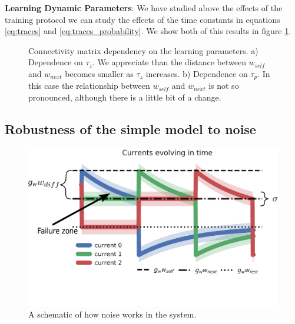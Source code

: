 \documentclass[10pt,a4paper]{article}
\begin{document}
\textbf{Learning Dynamic Parameters}:
We have studied above the effects of the training protocol we can study the effects of the time constants in equations \ref{eq:traces} and \ref{eq:traces_probability}. We show both of this results in figure \ref{fig:simple_bcpnn_learning_tau}. 

\begin{figure}[H]%
    \centering
    \qquad
    \caption{Connectivity matrix dependency on the learning parameters. a) Dependence on $\tau_z$. We appreciate than the distance between $w_{self}$ and $w_{next}$ becomes smaller as $\tau_z$ increases. b) Dependence on $\tau_p$. In this case the relationship between $w_{self}$ and $w_{next}$ is not so pronounced, although there is a little bit of a change. }
    \label{fig:simple_bcpnn_learning_tau}%
\end{figure}

\subsection{Robustness of the simple model to noise}

\begin{figure}[H]
\centering
\includegraphics[scale=0.55]{noise_diagram.pdf}
\caption{A schematic of how noise works in the system.}
\label{fig:noise_diagram}
\end{figure}
\end{document}
